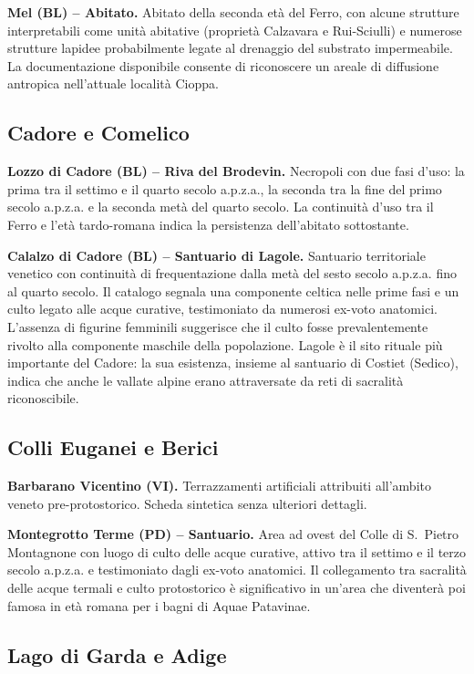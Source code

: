 \textbf{Mel (BL) -- Abitato.} Abitato della seconda età del Ferro, con alcune strutture interpretabili come unità abitative (proprietà Calzavara e Rui-Sciulli) e numerose strutture lapidee probabilmente legate al drenaggio del substrato impermeabile. La documentazione disponibile consente di riconoscere un areale di diffusione antropica nell'attuale località Cioppa.

\subsection{Cadore e Comelico}

\textbf{Lozzo di Cadore (BL) -- Riva del Brodevin.} Necropoli con due fasi d'uso: la prima tra il settimo e il quarto secolo a.p.z.a., la seconda tra la fine del primo secolo a.p.z.a. e la seconda metà del quarto secolo. La continuità d'uso tra il Ferro e l'età tardo-romana indica la persistenza dell'abitato sottostante.

\textbf{Calalzo di Cadore (BL) -- Santuario di Lagole.} \label{app:lagole} Santuario territoriale venetico con continuità di frequentazione dalla metà del sesto secolo a.p.z.a. fino al quarto secolo. Il catalogo segnala una componente celtica nelle prime fasi e un culto legato alle acque curative, testimoniato da numerosi ex-voto anatomici. L'assenza di figurine femminili suggerisce che il culto fosse prevalentemente rivolto alla componente maschile della popolazione. Lagole è il sito rituale più importante del Cadore: la sua esistenza, insieme al santuario di Costiet (Sedico), indica che anche le vallate alpine erano attraversate da reti di sacralità riconoscibile.

\subsection{Colli Euganei e Berici}

\textbf{Barbarano Vicentino (VI).} Terrazzamenti artificiali attribuiti all'ambito veneto pre-protostorico. Scheda sintetica senza ulteriori dettagli.

\textbf{Montegrotto Terme (PD) -- Santuario.} Area ad ovest del Colle di S.~Pietro Montagnone con luogo di culto delle acque curative, attivo tra il settimo e il terzo secolo a.p.z.a. e testimoniato dagli ex-voto anatomici. Il collegamento tra sacralità delle acque termali e culto protostorico è significativo in un'area che diventerà poi famosa in età romana per i bagni di Aquae Patavinae.

\subsection{Lago di Garda e Adige}

